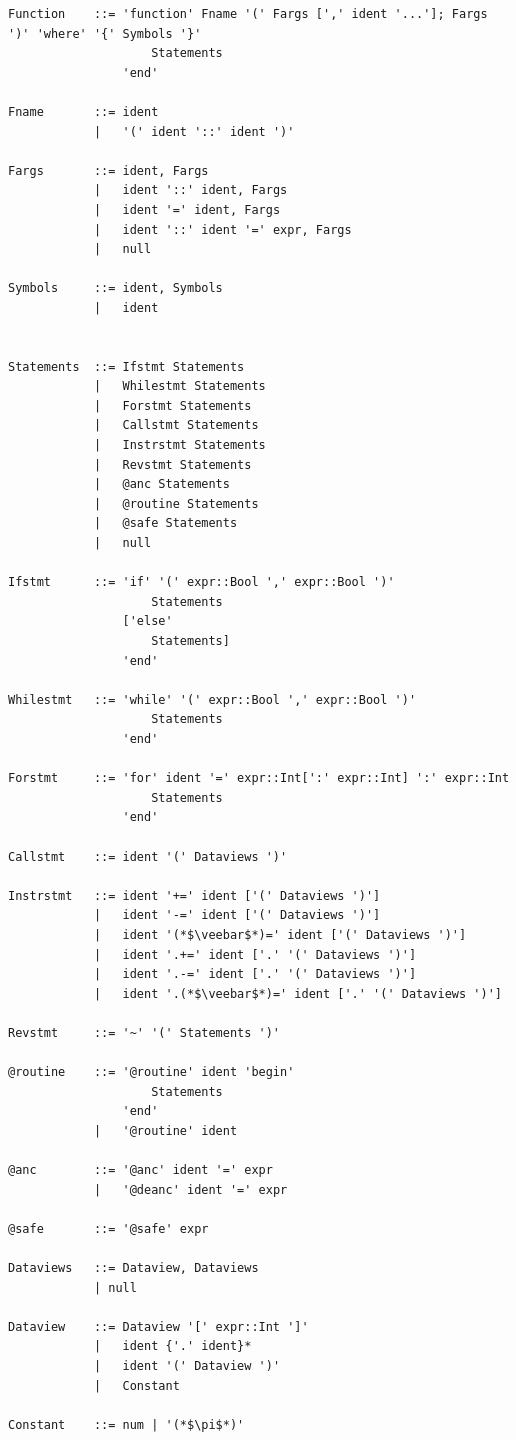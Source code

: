 \documentclass[aps,twocolumn,longbibliography,english,superscriptaddress,prr]{revtex4-1}
\newcommand{\<}{\langle}
\renewcommand{\>}{\rangle}
\begin{document}
\begin{minipage}{0.44\textwidth}
\begin{lstlisting}
Function    ::= 'function' Fname '(' Fargs [',' ident '...']; Fargs ')' 'where' '{' Symbols '}'
                    Statements
                'end'

Fname       ::= ident
            |   '(' ident '::' ident ')'

Fargs       ::= ident, Fargs
            |   ident '::' ident, Fargs
            |   ident '=' ident, Fargs
            |   ident '::' ident '=' expr, Fargs
            |   null

Symbols     ::= ident, Symbols
            |   ident


Statements  ::= Ifstmt Statements
            |   Whilestmt Statements
            |   Forstmt Statements
            |   Callstmt Statements
            |   Instrstmt Statements
            |   Revstmt Statements
            |   @anc Statements
            |   @routine Statements
            |   @safe Statements
            |   null

Ifstmt      ::= 'if' '(' expr::Bool ',' expr::Bool ')'
                    Statements
                ['else' 
                    Statements]
                'end'

Whilestmt   ::= 'while' '(' expr::Bool ',' expr::Bool ')'
                    Statements
                'end'

Forstmt     ::= 'for' ident '=' expr::Int[':' expr::Int] ':' expr::Int
                    Statements
                'end'

Callstmt    ::= ident '(' Dataviews ')'

Instrstmt   ::= ident '+=' ident ['(' Dataviews ')']
            |   ident '-=' ident ['(' Dataviews ')']
            |   ident '(*$\veebar$*)=' ident ['(' Dataviews ')']
            |   ident '.+=' ident ['.' '(' Dataviews ')']
            |   ident '.-=' ident ['.' '(' Dataviews ')']
            |   ident '.(*$\veebar$*)=' ident ['.' '(' Dataviews ')']

Revstmt     ::= '~' '(' Statements ')'

@routine    ::= '@routine' ident 'begin'
                    Statements
                'end'
            |   '@routine' ident

@anc        ::= '@anc' ident '=' expr
            |   '@deanc' ident '=' expr

@safe       ::= '@safe' expr

Dataviews   ::= Dataview, Dataviews
            | null

Dataview    ::= Dataview '[' expr::Int ']'
            |   ident {'.' ident}*
            |   ident '(' Dataview ')'
            |   Constant

Constant    ::= num | '(*$\pi$*)'

\end{lstlisting}

\end{minipage}
\end{document}

